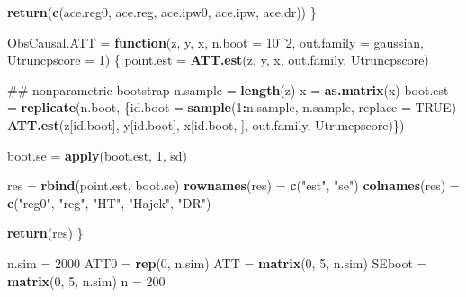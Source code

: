 \documentclass[]{article}
\newenvironment{Shaded}{\begin{snugshade}}{\end{snugshade}}
\newcommand{\KeywordTok}[1]{\textcolor[rgb]{0.13,0.29,0.53}{\textbf{#1}}}
\newcommand{\DataTypeTok}[1]{\textcolor[rgb]{0.13,0.29,0.53}{#1}}
\newcommand{\DecValTok}[1]{\textcolor[rgb]{0.00,0.00,0.81}{#1}}
\newcommand{\StringTok}[1]{\textcolor[rgb]{0.31,0.60,0.02}{#1}}
\newcommand{\OtherTok}[1]{\textcolor[rgb]{0.56,0.35,0.01}{#1}}
\newcommand{\ControlFlowTok}[1]{\textcolor[rgb]{0.13,0.29,0.53}{\textbf{#1}}}
\newcommand{\OperatorTok}[1]{\textcolor[rgb]{0.81,0.36,0.00}{\textbf{#1}}}
\newcommand{\NormalTok}[1]{#1}
\begin{document}
\begin{Shaded}
\begin{Highlighting}[]
  \KeywordTok{return}\NormalTok{(}\KeywordTok{c}\NormalTok{(ace.reg0, ace.reg, ace.ipw0, ace.ipw, ace.dr))     }
\NormalTok{\}}


\NormalTok{ObsCausal.ATT =}\StringTok{ }\ControlFlowTok{function}\NormalTok{(z, y, x, }\DataTypeTok{n.boot =} \DecValTok{10}\OperatorTok{^}\DecValTok{2}\NormalTok{,}
                         \DataTypeTok{out.family =}\NormalTok{ gaussian, }\DataTypeTok{Utruncpscore =} \DecValTok{1}\NormalTok{)}
\NormalTok{\{}
\NormalTok{  point.est  =}\StringTok{ }\KeywordTok{ATT.est}\NormalTok{(z, y, x, out.family, Utruncpscore)}
  
\NormalTok{  ## nonparametric bootstrap}
\NormalTok{  n.sample   =}\StringTok{ }\KeywordTok{length}\NormalTok{(z)}
\NormalTok{  x          =}\StringTok{ }\KeywordTok{as.matrix}\NormalTok{(x)}
\NormalTok{  boot.est   =}\StringTok{ }\KeywordTok{replicate}\NormalTok{(n.boot, }
\NormalTok{                         \{id.boot =}\StringTok{ }\KeywordTok{sample}\NormalTok{(}\DecValTok{1}\OperatorTok{:}\NormalTok{n.sample, n.sample, }\DataTypeTok{replace =} \OtherTok{TRUE}\NormalTok{)}
                          \KeywordTok{ATT.est}\NormalTok{(z[id.boot], y[id.boot], x[id.boot, ], }
\NormalTok{                                  out.family, Utruncpscore)\})}
  
\NormalTok{  boot.se    =}\StringTok{ }\KeywordTok{apply}\NormalTok{(boot.est, }\DecValTok{1}\NormalTok{, sd)}
  
\NormalTok{  res        =}\StringTok{ }\KeywordTok{rbind}\NormalTok{(point.est, boot.se)}
  \KeywordTok{rownames}\NormalTok{(res) =}\StringTok{ }\KeywordTok{c}\NormalTok{(}\StringTok{"est"}\NormalTok{, }\StringTok{"se"}\NormalTok{)}
  \KeywordTok{colnames}\NormalTok{(res) =}\StringTok{ }\KeywordTok{c}\NormalTok{(}\StringTok{"reg0"}\NormalTok{, }\StringTok{"reg"}\NormalTok{, }\StringTok{"HT"}\NormalTok{, }\StringTok{"Hajek"}\NormalTok{, }\StringTok{"DR"}\NormalTok{)}
  
  \KeywordTok{return}\NormalTok{(res)}
\NormalTok{\}}



\NormalTok{n.sim   =}\StringTok{ }\DecValTok{2000}
\NormalTok{ATT0    =}\StringTok{ }\KeywordTok{rep}\NormalTok{(}\DecValTok{0}\NormalTok{, n.sim)}
\NormalTok{ATT     =}\StringTok{ }\KeywordTok{matrix}\NormalTok{(}\DecValTok{0}\NormalTok{, }\DecValTok{5}\NormalTok{, n.sim)}
\NormalTok{SEboot  =}\StringTok{ }\KeywordTok{matrix}\NormalTok{(}\DecValTok{0}\NormalTok{, }\DecValTok{5}\NormalTok{, n.sim)}
\NormalTok{n       =}\StringTok{ }\DecValTok{200}


\end{Highlighting}
\end{Shaded}
\end{document}

